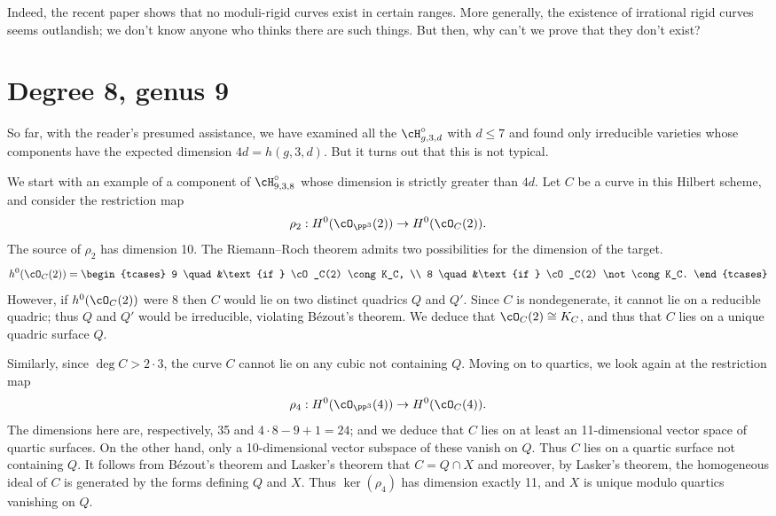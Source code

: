 Indeed, the recent paper \cite{MR3980289} shows that no moduli-rigid
curves
exist in certain ranges. More generally,  the existence of irrational
rigid curves seems outlandish; we don't know anyone who thinks there
are such things. But then, why can't we prove that they don't exist?



\section{Degree 8, genus 9}\label{degree 8 section}

So far, with the reader's presumed assistance, we have examined all the
$\cH^\circ_{g,3,d}$ with $d\leq 7$
and found only irreducible varieties whose components have the expected
dimension $4d = h(g,3,d)$. But it turns out that
this is not typical.

We start with an example of a component of $\cH^\circ_{9,3,8}$ whose
%
dimension is strictly greater than $4d$.  Let $C$ be  a curve in this
Hilbert scheme, and consider the restriction map
$$
\rho_2 : H^0(\cO_{\PP^3}(2)) \to H^0(\cO_C(2)).
$$
The source of $\rho_2$ has dimension 10. The Riemann--Roch theorem admits
two possibilities for the dimension
of the target.
$$
h^0(\cO_C(2)) =
\begin{tcases}
9 \quad &\text{if } \cO_C(2) \cong K_C, \\
8 \quad &\text{if } \cO_C(2) \not\cong K_C.
\end{tcases}
$$
However, if $h^0(\cO_C(2))$ were 8 then $C$ would  lie on two distinct
quadrics $Q$ and $Q'$. Since $C$ is nondegenerate, it cannot lie on a
reducible quadric; thus $Q$ and $Q'$ would  be irreducible,  violating
B\'ezout's theorem. We deduce that $\cO_C(2) \cong K_C$, and thus that
$C$ lies on a unique quadric surface $Q$.

Similarly, since $\deg C > 2\cdot 3$, the curve $C$ cannot lie on any
cubic not containing $Q$. Moving on to quartics, we look again at the
restriction map
$$
\rho_4 : H^0(\cO_{\PP^3}(4)) \to H^0(\cO_C(4)).
$$
The dimensions here are, respectively, 35 and $4\cdot 8 - 9 + 1 = 24$;
and we deduce that $C$ lies on at least an 11-dimensional vector space
of quartic surfaces. On the other hand, only a 10-dimensional vector
subspace of these vanish on $Q$. Thus $C$ lies on a quartic surface not
containing $Q$. It follows from B\'ezout's theorem and
Lasker's theorem that  $C = Q \cap X$
and moreover, by Lasker's theorem, the homogeneous ideal of $C$ is
generated by the forms defining $Q$ and $X$. Thus $\ker(\rho_4)$ has
dimension exactly 11, and  $X$ is unique modulo quartics vanishing on $Q$.

